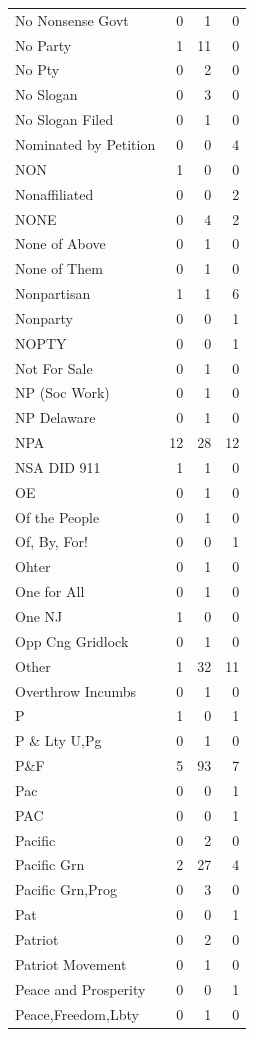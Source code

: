 \begin{supertabular}{lrrr}
No Nonsense Govt & 0 & 1 & 0\\
No Party & 1 & 11 & 0\\
No Pty & 0 & 2 & 0\\
No Slogan & 0 & 3 & 0\\
No Slogan Filed & 0 & 1 & 0\\
Nominated by Petition & 0 & 0 & 4\\
NON & 1 & 0 & 0\\
Nonaffiliated & 0 & 0 & 2\\
NONE & 0 & 4 & 2\\
None of Above & 0 & 1 & 0\\
None of Them & 0 & 1 & 0\\
Nonpartisan & 1 & 1 & 6\\
Nonparty & 0 & 0 & 1\\
NOPTY & 0 & 0 & 1\\
Not For Sale & 0 & 1 & 0\\
NP (Soc Work) & 0 & 1 & 0\\
NP Delaware & 0 & 1 & 0\\
NPA & 12 & 28 & 12\\
NSA DID 911 & 1 & 1 & 0\\
OE & 0 & 1 & 0\\
Of the People & 0 & 1 & 0\\
Of, By, For! & 0 & 0 & 1\\
Ohter & 0 & 1 & 0\\
One for All & 0 & 1 & 0\\
One NJ & 1 & 0 & 0\\
Opp Cng Gridlock & 0 & 1 & 0\\
Other & 1 & 32 & 11\\
Overthrow Incumbs & 0 & 1 & 0\\
P & 1 & 0 & 1\\
P \& Lty U,Pg & 0 & 1 & 0\\
P\&F & 5 & 93 & 7\\
Pac & 0 & 0 & 1\\
PAC & 0 & 0 & 1\\
Pacific & 0 & 2 & 0\\
Pacific Grn & 2 & 27 & 4\\
Pacific Grn,Prog & 0 & 3 & 0\\
Pat & 0 & 0 & 1\\
Patriot & 0 & 2 & 0\\
Patriot Movement & 0 & 1 & 0\\
Peace and Prosperity & 0 & 0 & 1\\
Peace,Freedom,Lbty & 0 & 1 & 0\\

\end{supertabular}
